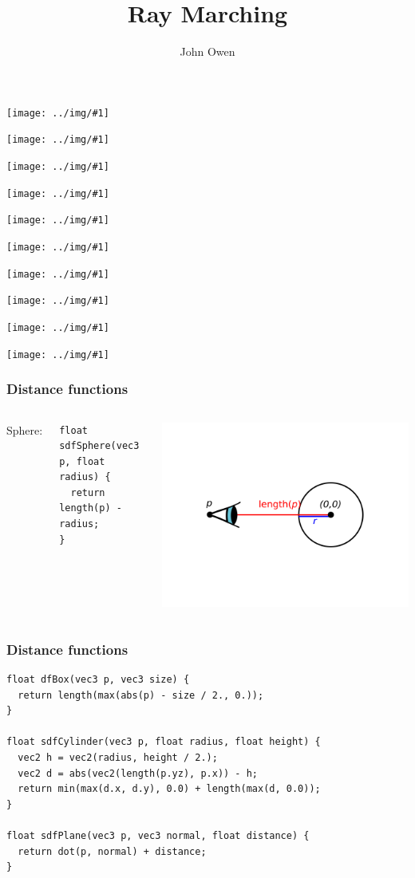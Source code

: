\documentclass{beamer}
\title{Ray Marching}
\author{John Owen}
\date{}
\newcommand\imageframe[1]{
    \begin{frame}[plain]
        \texttt{[image: ../img/\#1]}
    \end{frame}
}
\begin{document}
\frame{\titlepage}

\imageframe{raymarch1.png}
\imageframe{raymarch2.png}
\imageframe{raymarch3.png}
\imageframe{raymarch4.png}
\imageframe{raymarch5.png}
\imageframe{raymarch6.png}
\imageframe{raymarch7.png}
\imageframe{raymarch8.png}
\imageframe{raymarch9.png}
\imageframe{raymarch10.png}

\begin{frame}[fragile]
    \frametitle{Distance functions}
    \begin{columns}
        Sphere:
    \begin{verbatim}
float sdfSphere(vec3 p, float radius) {
  return length(p) - radius;
}
    \end{verbatim}
        \includegraphics[keepaspectratio=true,width=\textwidth]{../img/looking-outside-circle.png}
    \end{columns}
\end{frame}

\begin{frame}[fragile]
    \frametitle{Distance functions}
    \begin{verbatim}
float dfBox(vec3 p, vec3 size) {
  return length(max(abs(p) - size / 2., 0.));
}

float sdfCylinder(vec3 p, float radius, float height) {
  vec2 h = vec2(radius, height / 2.);
  vec2 d = abs(vec2(length(p.yz), p.x)) - h;
  return min(max(d.x, d.y), 0.0) + length(max(d, 0.0));
}

float sdfPlane(vec3 p, vec3 normal, float distance) {
  return dot(p, normal) + distance;
}
    \end{verbatim}
\end{frame}
\end{document}
